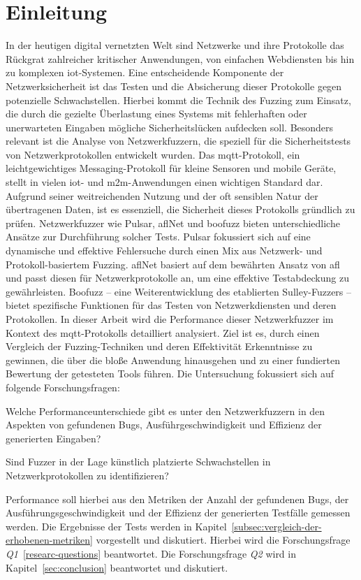 \section{Einleitung}\label{sec:einleitung}
In der heutigen digital vernetzten Welt sind Netzwerke und ihre Protokolle das Rückgrat zahlreicher kritischer Anwendungen,
von einfachen Webdiensten bis hin zu komplexen \gls{iot}-Systemen.
Eine entscheidende Komponente der Netzwerksicherheit ist das Testen und die Absicherung dieser Protokolle gegen potenzielle Schwachstellen.
Hierbei kommt die Technik des Fuzzing zum Einsatz, die durch die gezielte Überlastung eines Systems mit fehlerhaften oder
unerwarteten Eingaben mögliche Sicherheitslücken aufdecken soll.
Besonders relevant ist die Analyse von Netzwerkfuzzern, die speziell für die Sicherheitstests von Netzwerkprotokollen entwickelt wurden.
Das \gls{mqtt}-Protokoll, ein leichtgewichtiges Messaging-Protokoll für kleine Sensoren und mobile Geräte, stellt in vielen
\gls{iot}- und \gls{m2m}-Anwendungen einen wichtigen Standard dar.
Aufgrund seiner weitreichenden Nutzung und der oft sensiblen Natur der übertragenen Daten, ist es essenziell, die Sicherheit
dieses Protokolls gründlich zu prüfen.
Netzwerkfuzzer wie Pulsar, \gls{afl}Net und boofuzz bieten unterschiedliche Ansätze zur Durchführung solcher Tests.
Pulsar fokussiert sich auf eine dynamische und effektive Fehlersuche durch einen Mix aus Netzwerk- und Protokoll-basiertem
Fuzzing.
\gls{afl}Net basiert auf dem bewährten Ansatz von \gls{afl} und passt diesen für Netzwerkprotokolle an, um eine effektive
Testabdeckung zu gewährleisten.
Boofuzz -- eine Weiterentwicklung des etablierten Sulley-Fuzzers -- bietet spezifische Funktionen für das Testen von
Netzwerkdiensten und deren Protokollen.
In dieser Arbeit wird die Performance dieser Netzwerkfuzzer im Kontext des \gls{mqtt}-Protokolls detailliert analysiert.
Ziel ist es, durch einen Vergleich der Fuzzing-Techniken und deren Effektivität Erkenntnisse zu gewinnen, die über die bloße
Anwendung hinausgehen und zu einer fundierten Bewertung der getesteten Tools führen.
Die Untersuchung fokussiert sich auf folgende Forschungsfragen:
\begin{questions}\label{researc-questions}
    \item Welche Performanceunterschiede gibt es unter den Netzwerkfuzzern in den Aspekten von gefundenen Bugs, Ausführgeschwindigkeit
        und Effizienz der generierten Eingaben?
    \item Sind Fuzzer in der Lage künstlich platzierte Schwachstellen in Netzwerkprotokollen zu identifizieren?
\end{questions}
Performance soll hierbei aus den Metriken der Anzahl der gefundenen Bugs, der Ausführungsgeschwindigkeit und der Effizienz
der generierten Testfälle gemessen werden.
Die Ergebnisse der Tests werden in Kapitel~\ref{subsec:vergleich-der-erhobenen-metriken} vorgestellt und diskutiert.
Hierbei wird die Forschungsfrage \textit{Q1}~\ref{researc-questions} beantwortet.
Die Forschungsfrage \textit{Q2} wird in Kapitel~\ref{sec:conclusion} beantwortet und diskutiert.